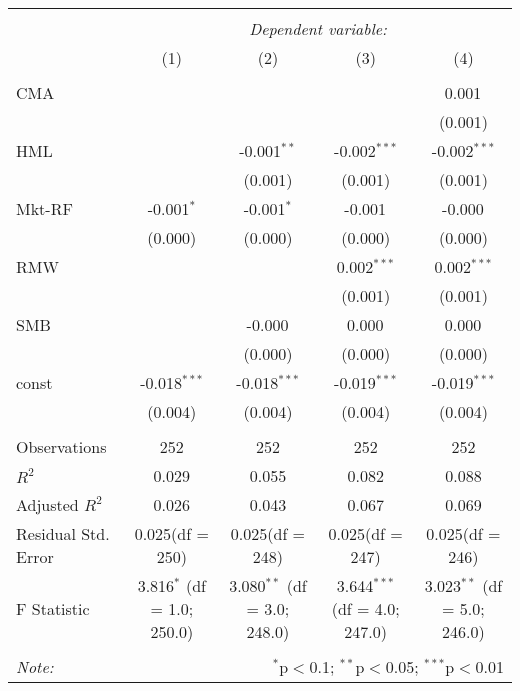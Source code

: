 \begin{table}[!htbp] \centering
\begin{tabular}{@{\extracolsep{5pt}}lcccc}
\\[-1.8ex]\hline
\hline \\[-1.8ex]
& \multicolumn{4}{c}{\textit{Dependent variable:}} \
\cr \cline{4-5}
\\[-1.8ex] & (1) & (2) & (3) & (4) \\
\hline \\[-1.8ex]
 CMA & & & & 0.001$^{}$ \\
  & & & & (0.001) \\
 HML & & -0.001$^{**}$ & -0.002$^{***}$ & -0.002$^{***}$ \\
  & & (0.001) & (0.001) & (0.001) \\
 Mkt-RF & -0.001$^{*}$ & -0.001$^{*}$ & -0.001$^{}$ & -0.000$^{}$ \\
  & (0.000) & (0.000) & (0.000) & (0.000) \\
 RMW & & & 0.002$^{***}$ & 0.002$^{***}$ \\
  & & & (0.001) & (0.001) \\
 SMB & & -0.000$^{}$ & 0.000$^{}$ & 0.000$^{}$ \\
  & & (0.000) & (0.000) & (0.000) \\
 const & -0.018$^{***}$ & -0.018$^{***}$ & -0.019$^{***}$ & -0.019$^{***}$ \\
  & (0.004) & (0.004) & (0.004) & (0.004) \\
\hline \\[-1.8ex]
 Observations & 252 & 252 & 252 & 252 \\
 $R^2$ & 0.029 & 0.055 & 0.082 & 0.088 \\
 Adjusted $R^2$ & 0.026 & 0.043 & 0.067 & 0.069 \\
 Residual Std. Error & 0.025(df = 250) & 0.025(df = 248) & 0.025(df = 247) & 0.025(df = 246)  \\
 F Statistic & 3.816$^{*}$ (df = 1.0; 250.0) & 3.080$^{**}$ (df = 3.0; 248.0) & 3.644$^{***}$ (df = 4.0; 247.0) & 3.023$^{**}$ (df = 5.0; 246.0) \\
\hline
\hline \\[-1.8ex]
\textit{Note:} & \multicolumn{4}{r}{$^{*}$p$<$0.1; $^{**}$p$<$0.05; $^{***}$p$<$0.01} \\
\end{tabular}
\end{table}
